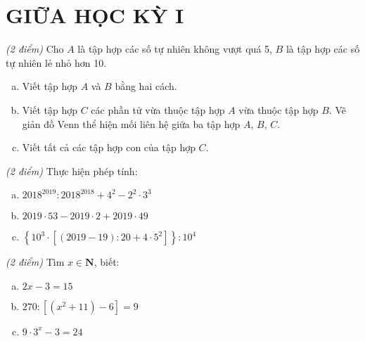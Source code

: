 \section{GIỮA HỌC KỲ I}
\setcounter{ex}{0}
\begin{ex}  \textit{(2 điểm)} Cho $A$ là tập hợp các số tự nhiên không vượt quá 5, $B$  là tập hợp các số tự nhiên lẻ nhỏ hơn 10.
\begin{enumerate} [a)]
\item Viết tập hợp $A$ và $B$ bằng hai cách.
\item Viết tập hợp $C$ các phần tử vừa thuộc tập hợp $A$ vừa thuộc tập hợp $B$. Vẽ giản đồ Venn thể hiện mối liên hệ giữa ba tập hợp $A$, $B$, $C$.
\item Viết tất cả các tập hợp con của tập hợp $C$.

\end{enumerate}
\end{ex}     \begin{ex} \textit{(2 điểm)} Thực hiện phép tính:
\begin{enumerate} [a)]
\item ${2018^{2019}}:{2018^{2018}} + {4^2} - {2^2} \cdot {3^3}$
\item $2019 \cdot 53 - 2019 \cdot 2 + 2019 \cdot 49$
\item $\left\{ {{{10}^3} \cdot \left[ {\left( {2019 - 19} \right):20 + 4 \cdot {5^2}} \right]} \right\}:{10^4}$

\end{enumerate}
\end{ex}     \begin{ex} \textit{(2 điểm)} Tìm $x \in \mathbf{N}$, biết:
 \begin{enumerate}[a)]
\item $2x - 3 = 15$ 
\item $270:\left[ {\left( {{x^2} + 11} \right) - 6} \right] = 9$
\item $9 \cdot {3^x} - 3 = 24$ 


\end{enumerate}
\end{ex}

